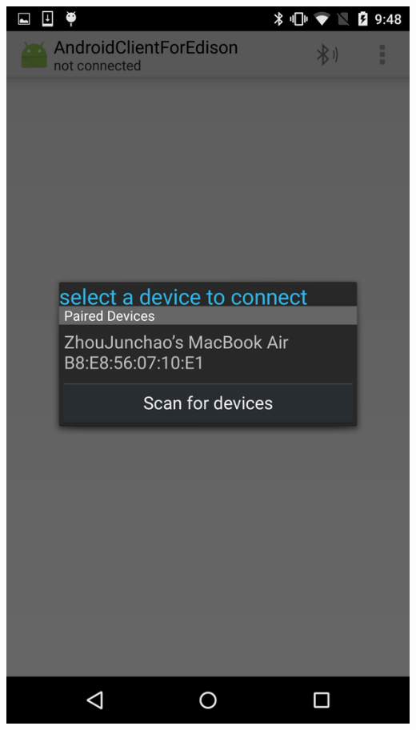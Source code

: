 \documentclass[]{article}
\begin{document}
\includegraphics[keepaspectratio, width=\textwidth]{photo2}
\end{document}
